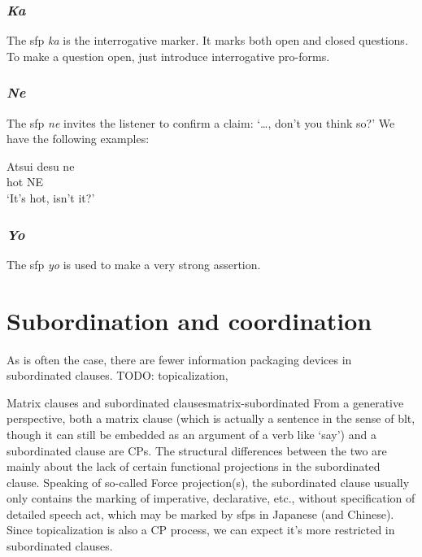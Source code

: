 \documentclass[UTF8, a4paper, oneside, scheme=plain]{ctexrep}
\newcommand{\corpus}[1]{\emph{#1}}
\newcommand{\translate}[1]{`#1'}
\begin{document}
\subsection{\corpus{Ka}}

The \ac{sfp} \corpus{ka} is the interrogative marker.
It marks both open and closed questions.
To make a question open,
just introduce interrogative pro-forms.

\subsection{\corpus{Ne}}

The \ac{sfp} \corpus{ne} invites the listener to confirm a claim:
\translate{\dots, don't you think so?}
We have the following examples:
\begin{exe}
    \ex \gll Atsui desu ne  \\
    hot {} NE  \\
    \glt \translate{It's hot, isn't it?}
\end{exe}

\subsection{\corpus{Yo}}

The \ac{sfp} \corpus{yo} is used to make a very strong assertion.

\chapter{Subordination and coordination}

As is often the case, there are fewer information packaging devices in subordinated clauses.
TODO: topicalization, 

\begin{theorybox}{Matrix clauses and subordinated clauses}{matrix-subordinated}
    From a generative perspective, both a matrix clause 
    (which is actually a sentence in the sense of \acs{blt}, 
    though it can still be embedded as an argument of a verb like \translate{say})
    and a subordinated clause are CPs.
    The structural differences between the two 
    are mainly about the lack of certain functional projections in the subordinated clause.
    Speaking of so-called Force projection(s),
    the subordinated clause usually only contains the marking of 
    imperative, declarative, etc.,
    without specification of detailed speech act,
    which may be marked by \ac{sfp}s in Japanese (and Chinese).
    Since topicalization is also a CP process,
    we can expect it's more restricted in subordinated clauses.
\end{theorybox}
\end{document}
